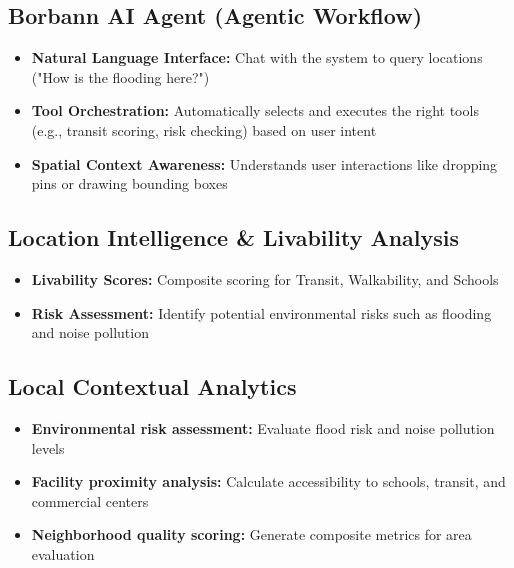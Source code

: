 \subsection{Borbann AI Agent (Agentic Workflow)}  
\begin{itemize}  
    \item \textbf{Natural Language Interface:} Chat with the system to query locations ("How is the flooding here?")
    \item \textbf{Tool Orchestration:} Automatically selects and executes the right tools (e.g., transit scoring, risk checking) based on user intent
    \item \textbf{Spatial Context Awareness:} Understands user interactions like dropping pins or drawing bounding boxes
\end{itemize}  

\subsection{Location Intelligence \& Livability Analysis}  
\begin{itemize}  
    \item \textbf{Livability Scores:} Composite scoring for Transit, Walkability, and Schools
    \item \textbf{Risk Assessment:} Identify potential environmental risks such as flooding and noise pollution
\end{itemize}

\subsection{Local Contextual Analytics}  
\begin{itemize}  
    \item \textbf{Environmental risk assessment:} Evaluate flood risk and noise pollution levels  
    \item \textbf{Facility proximity analysis:} Calculate accessibility to schools, transit, and commercial centers  
    \item \textbf{Neighborhood quality scoring:} Generate composite metrics for area evaluation  
\end{itemize}  
  
